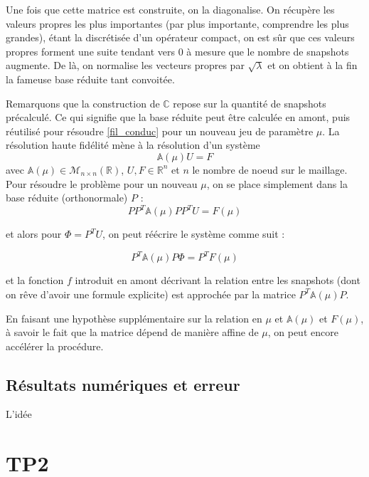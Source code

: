 \documentclass[12pt,a4paper,article]{memoir} %
\begin{document}
\vspace{0.3cm}

Une fois que cette matrice est construite, on la diagonalise. On récupère les valeurs propres les plus importantes 
(par plus importante, comprendre les plus grandes), étant la discrétisée d'un opérateur compact, on est sûr que ces valeurs propres forment
une suite tendant vers 0 à mesure que le nombre de snapshots augmente. De là, on normalise les vecteurs propres par $\sqrt{\lambda}$ et on obtient à la fin la 
fameuse base réduite tant convoitée. 

\vspace{0.3cm}

Remarquons que la construction de $\mathbb{C}$ repose sur la quantité de snapshots précalculé. Ce qui signifie que la base réduite
peut être calculée en amont, puis réutilisé pour résoudre \eqref{fil_conduc} pour un nouveau jeu de paramètre $\mu$. 
La résolution haute fidélité mène à la résolution d'un système
\[
\mathbb{A}(\mu)U = F
\]
avec $\mathbb{A}(\mu) \in \mathcal{M}_{n\times n}(\mathbb{R})$, $U, F \in \mathbb{R}^n$ et $n$ le nombre de noeud sur le 
maillage. Pour résoudre le problème pour un nouveau $\mu$, on se place simplement dans la base réduite (orthonormale) $P$ :
\[
PP^T\mathbb{A}(\mu)PP^TU = F(\mu)
\]   

et alors pour $\Phi = P^TU$, on peut réécrire le système comme suit : 

\[
P^T\mathbb{A}(\mu)P\Phi = P^TF(\mu)
\] 

et la fonction $f$ introduit en amont décrivant la relation entre les snapshots (dont on rêve d'avoir une formule explicite) 
est approchée par la matrice $P^T\mathbb{A}(\mu)P$.  

\vspace{0.3cm}

En faisant une hypothèse supplémentaire sur la relation en $\mu$ et $\mathbb{A(\mu)}$ et $F(\mu)$, à savoir le fait
que la matrice dépend de manière affine de $\mu$, on peut encore accélérer la procédure.

\newpage


\subsection{Résultats numériques et erreur}
L'idée 

\newpage

\section{TP2}
\end{document}
